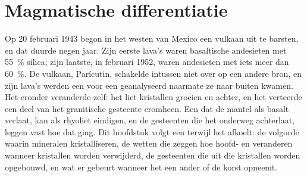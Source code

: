 \chapter{Magmatische differentiatie}\label{ch:b2:magmatic-differentiation}

Op 20 februari 1943 begon in het westen van Mexico een vulkaan uit te barsten, en dat
duurde negen jaar. Zijn eerste lava's waren basaltische andesieten met \qty{55}{\percent}
silica; zijn laatste, in februari 1952, waren andesieten met iets meer dan
\qty{60}{\percent}. De vulkaan, Parícutin, schakelde intussen niet over op een andere bron,
en zijn lava's werden een voor een geanalyseerd naarmate ze naar buiten kwamen. Het
 eronder veranderde zelf: het liet kristallen groeien en achter, en het verteerde
een deel van het granitische gesteente eromheen. Een  dat de mantel als basalt verlaat, kan
als rhyoliet eindigen, en de gesteenten die het onderweg achterlaat, leggen vast hoe dat ging.
Dit hoofdstuk volgt een  terwijl het afkoelt: de volgorde waarin mineralen kristalliseren,
de wetten die zeggen hoe hoofd- en  veranderen wanneer kristallen worden verwijderd,
de gesteenten die uit die kristallen worden opgebouwd, en wat er gebeurt wanneer het  een
ander  of de korst opneemt.

